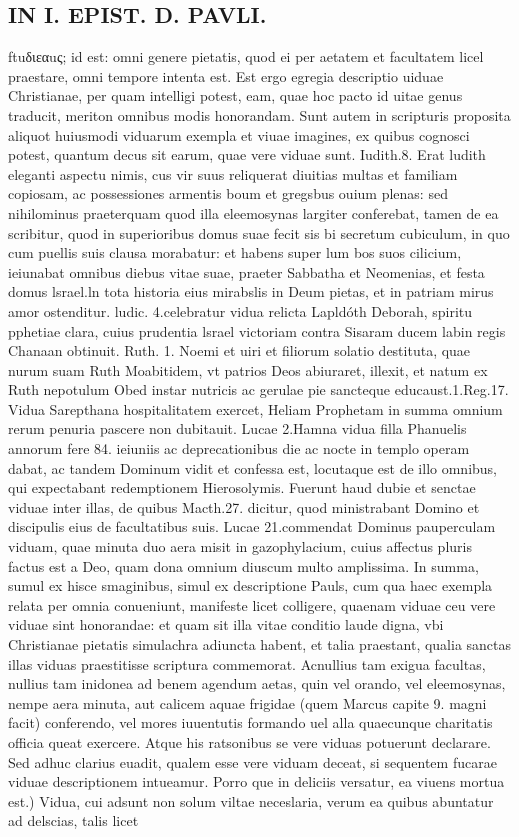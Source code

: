 \documentclass{article}
\begin{document}
\begin{pages}
\section*{IN I. EPIST. D. PAVLI. }
\marginpar{[ p.106 ]}\pstart ftuδιεαuς; id est: omni genere pietatis, quod ei per aetatem et facultatem licel praestare, omni tempore intenta est. Est ergo egregia descriptio uiduae Christianae, per quam intelligi potest, eam, quae hoc pacto id uitae genus traducit, meriton omnibus modis honorandam. Sunt autem in scripturis proposita aliquot huiusmodi viduarum exempla et viuae imagines, ex quibus cognosci potest, quantum decus sit earum, quae vere viduae sunt. Iudith.8. Erat ludith eleganti aspectu nimis, cus vir suus reliquerat diuitias multas et familiam copiosam, ac possessiones armentis boum et gregsbus ouium plenas: sed nihilominus praeterquam quod illa eleemosynas largiter conferebat, tamen de ea scribitur, quod in superioribus domus suae fecit sis bi secretum cubiculum, in quo cum puellis suis clausa morabatur: et habens super lum bos suos cilicium, ieiunabat omnibus diebus vitae suae, praeter Sabbatha et Neomenias, et festa domus lsrael.ln tota historia eius mirabslis in Deum pietas, et in patriam mirus amor ostenditur. ludic. 4.celebratur vidua relicta Lapldóth Deborah, spiritu pphetiae clara, cuius prudentia lsrael victoriam contra Sisaram ducem labin regis Chanaan obtinuit. Ruth. 1. Noemi et uiri et filiorum solatio destituta, quae nurum suam Ruth Moabitidem, vt patrios Deos abiuraret, illexit, et natum ex Ruth nepotulum Obed instar nutricis ac gerulae pie sancteque educaust.1.Reg.17. Vidua Sarepthana hospitalitatem exercet, Heliam Prophetam in summa omnium rerum penuria pascere non dubitauit. Lucae 2.Hamna vidua filla Phanuelis annorum fere 84. ieiuniis ac deprecationibus die ac nocte in templo operam dabat, ac tandem Dominum vidit et confessa est, locutaque est de illo omnibus, qui expectabant redemptionem Hierosolymis. Fuerunt haud dubie et senctae viduae inter illas, de quibus Macth.27. dicitur, quod ministrabant Domino et discipulis eius de facultatibus suis. Lucae 21.commendat Dominus pauperculam viduam, quae minuta duo aera misit in gazophylacium, cuius affectus pluris factus est a Deo, quam dona omnium diuscum multo amplissima. In summa, sumul ex hisce smaginibus, simul ex descriptione Pauls, cum qua haec exempla relata per omnia conueniunt, manifeste licet colligere, quaenam viduae ceu vere viduae sint honorandae: et quam sit illa vitae conditio laude digna, vbi Christianae pietatis simulachra adiuncta habent, et talia praestant, qualia sanctas illas viduas praestitisse scriptura commemorat. Acnullius tam exigua facultas, nullius tam inidonea ad benem agendum aetas, quin vel orando, vel eleemosynas, nempe aera minuta, aut calicem aquae frigidae (quem Marcus capite 9. magni facit) conferendo, vel mores iuuentutis formando uel alla quaecunque charitatis officia queat exercere. Atque his ratsonibus se vere viduas potuerunt declarare. Sed adhuc clarius euadit, qualem esse vere viduam deceat, si sequentem fucarae viduae descriptionem intueamur.  \pend\pstart Porro que in deliciis versatur, ea viuens mortua est.) Vidua, cui adsunt non solum viltae neceslaria, verum ea quibus abuntatur ad delscias, talis licet 
\end{pages}
\end{document}
